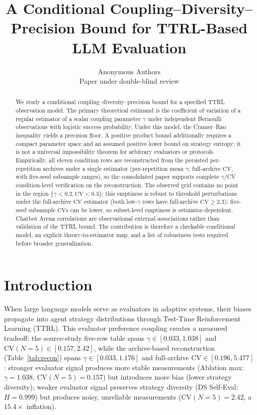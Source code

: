\documentclass[11pt]{article}
\author{Anonymous Authors\\Paper under double-blind review}
\title{A Conditional Coupling--Diversity--Precision Bound for TTRL-Based LLM Evaluation}
\begin{document}
\maketitle
\begin{abstract}
We study a conditional coupling--diversity--precision bound for a specified TTRL observation model. The primary theoretical estimand is the coefficient of variation of a regular estimator of a scalar coupling parameter $\gamma$ under independent Bernoulli observations with logistic success probability. Under this model, the Cramer--Rao inequality yields a precision floor. A positive product bound additionally requires a compact parameter space and an assumed positive lower bound on strategy entropy; it is not a universal impossibility theorem for arbitrary evaluators or protocols. Empirically, all eleven condition rows are reconstructed from the persisted per-repetition archives under a single estimator (per-repetition mean $\gamma$; full-archive $\mathrm{CV}$, with five-seed subsample ranges), so the consolidated paper supports complete $\gamma$/CV condition-level verification on the reconstruction. The observed grid contains no point in the region $\{\gamma<0.2,\mathrm{CV}<0.3\}$; this emptiness is robust to threshold perturbations under the full-archive $\mathrm{CV}$ estimator (both low-$\gamma$ rows have full-archive $\mathrm{CV} \geq 2.3$); five-seed subsample $\mathrm{CV}$s can be lower, so subset-level emptiness is estimator-dependent. Chatbot Arena correlations are observational external associations rather than validation of the TTRL bound. The contribution is therefore a checkable conditional model, an explicit theory-to-estimator map, and a list of robustness tests required before broader generalization.
\end{abstract}

\section{Introduction}

When large language models serve as evaluators in adaptive systems, their biases propagate into agent strategy distributions through Test-Time Reinforcement Learning (TTRL). This evaluator preference coupling creates a measured tradeoff: the source-study five-row table spans $\gamma \in [0.033, 1.038]$ and $\mathrm{CV}(N{=}5) \in [0.157, 2.42]$, while the archive-based reconstruction (Table~\ref{tab:recon}) spans $\gamma \in [0.033, 1.176]$ and full-archive $\mathrm{CV} \in [0.196, 5.477]$: stronger evaluator signal produces more stable measurements (Ablation max: $\gamma = 1.038$, $\mathrm{CV}(N{=}5) = 0.157$) but introduces more bias (lower strategy diversity); weaker evaluator signal preserves strategy diversity (DS Self-Eval: $H = 0.999$) but produces noisy, unreliable measurements ($\mathrm{CV}(N{=}5) = 2.42$, a $15.4\times$ inflation).
\end{document}
